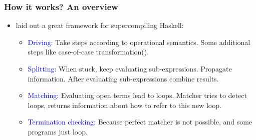 \documentclass{beamer}
\begin{document}
\begin{frame}
    \frametitle{How it works? An overview}

    \begin{itemize}
        \item[]
            \citet{callbyneed-sc} laid out a great framework for
            supercompiling Haskell:
            \begin{itemize}[<+->]
                \item
                    \textcolor{blue}{Driving:} Take steps according to operational
                    semantics.  Some additional steps like case-of-case
                    transformation(\citet{Jones98atransformation-based}).
                \item
                    \textcolor{blue}{Splitting:} When stuck, keep evaluating
                    sub-expressions. Propagate information. After evaluating
                    sub-expressions combine results.
                \item
                    \textcolor{blue}{Matching:} Evaluating open terms lead to loops.
                    Matcher tries to detect loops, returns information about how
                    to refer to this new loop.
                \item
                    \textcolor{blue}{Termination checking:} Because perfect matcher is
                    not possible, and some programs just loop.
            \end{itemize}
    \end{itemize}
\end{frame}

{
    
}
\end{document}
